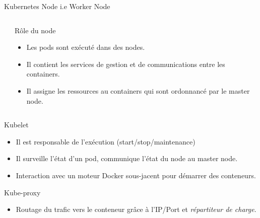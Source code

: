 \documentclass{bredelebeamer}
\begin{document}
\begin{frame}{Kubernetes Node i.e Worker Node}
\begin{columns}
\begin{column}{0.3\textwidth}
\end{column}
\begin{column}{0.7\textwidth}
\begin{block}{Rôle du node}
\begin{itemize}
\item Les pods sont exécuté dans des nodes. 
\item Il contient les services de gestion et de communications entre les containers.
\item Il assigne les ressources au containers qui sont ordonnancé par le master node.
\end{itemize}
\end{block}\pause
\end{column}
\end{columns}
\begin{block}{Kubelet}
\begin{itemize}
\item Il est responsable de l'exécution (start/stop/maintenance)
\item Il surveille l'état d'un pod, %
communique l'état du node au master node.
\item Interaction avec un moteur Docker sous-jacent pour démarrer des conteneurs.
\end{itemize}
\end{block}\pause
\begin{block}{Kube-proxy}
\begin{itemize}
\item Routage du trafic vers le conteneur grâce à l'IP/Port et \textit{répartiteur de charge}.
\end{itemize}
\end{block}
\end{frame}
\end{document}
